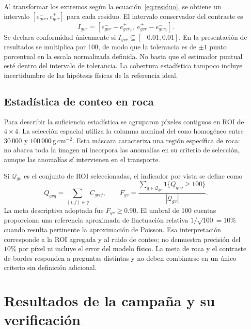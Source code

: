 \documentclass[11pt,a4paper]{article}
\newcommand{\ind}{\mathbf{1}}
\begin{document}
Al transformar los extremos según la ecuación~\eqref{eq:residuo}, se obtiene un intervalo $[e^-_{gvr},e^+_{gvr}]$ para cada residuo. El intervalo conservador del contraste es
\begin{equation}
 I_{gvr}=\left[e^-_{gvr}-e^+_{gvr_0},\;
 e^+_{gvr}-e^-_{gvr_0}\right].
\end{equation}
Se declara conformidad únicamente si $I_{gvr}\subseteq[-0.01,0.01]$. En la presentación de resultados se multiplica por 100, de modo que la tolerancia es de $\pm1$ punto porcentual en la escala normalizada definida. No basta que el estimador puntual esté dentro del intervalo de tolerancia. La cobertura estadística tampoco incluye incertidumbre de las hipótesis físicas de la referencia ideal.

\subsection{Estadística de conteo en roca}

Para describir la suficiencia estadística se agruparon píxeles contiguos en ROI de $4\times4$. La selección espacial utiliza la columna nominal del cono homogéneo entre $30\,000$ y $100\,000\,\mathrm{g\,cm^{-2}}$. Esta máscara caracteriza una región específica de roca: no abarca toda la imagen ni incorpora las anomalías en su criterio de selección, aunque las anomalías sí intervienen en el transporte.

Si $\mathcal Q_{gv}$ es el conjunto de ROI seleccionadas, el indicador por vista se define como
\begin{equation}
 Q_{gvq}=\sum_{(i,j)\in q}C_{gvij},\qquad
 F_{gv}=\frac{\sum_{q\in\mathcal Q_{gv}}\ind\{Q_{gvq}\geq100\}}
 {|\mathcal Q_{gv}|}.
 \label{eq:roca}
\end{equation}
La meta descriptiva adoptada fue $F_{gv}\geq0.90$. El umbral de 100 cuentas proporciona una referencia aproximada de fluctuación relativa $1/\sqrt{100}=10\%$ cuando resulta pertinente la aproximación de Poisson. Esa interpretación corresponde a la ROI agregada y al ruido de conteo; no demuestra precisión del $10\%$ por píxel ni incluye el error del modelo físico. La meta de roca y el contraste de bordes responden a preguntas distintas y no deben combinarse en un único criterio sin definición adicional.

\section{Resultados de la campaña y su verificación}
\end{document}

